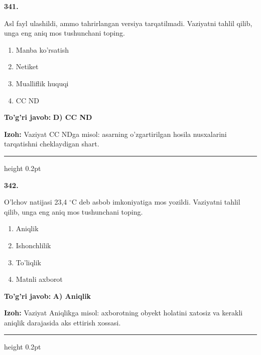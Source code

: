 \documentclass[10pt,a4paper,oneside]{article}
\begin{document}
\noindent\textbf{\color{ink}341.}
\par
Asl fayl ulashildi, ammo tahrirlangan versiya tarqatilmadi. Vaziyatni tahlil qilib, unga eng aniq mos tushunchani toping.
\begin{enumerate}[label=\Alph*),leftmargin=9mm]
\item Manba ko'rsatish
\item Netiket
\item Mualliflik huquqi
\item CC ND
\end{enumerate}
\begin{tcolorbox}[enhanced,breakable,colback=teal!4,colframe=teal!50!black,boxrule=0.5pt,arc=1.1mm,left=3mm,right=3mm,top=1.7mm,bottom=1.7mm,before skip=2mm,after skip=2mm]
\textbf{\color{teal}To'g'ri javob:} \textbf{D) CC ND}
\par\smallskip
\textbf{Izoh:} Vaziyat CC NDga misol: asarning o'zgartirilgan hosila nusxalarini tarqatishni cheklaydigan shart.
\end{tcolorbox}
\vspace{2mm}\hrule height 0.2pt \vspace{3mm}

\noindent\textbf{\color{ink}342.}
\par
O'lchov natijasi 23,4 \ensuremath{^\circ}C deb asbob imkoniyatiga mos yozildi. Vaziyatni tahlil qilib, unga eng aniq mos tushunchani toping.
\begin{enumerate}[label=\Alph*),leftmargin=9mm]
\item Aniqlik
\item Ishonchlilik
\item To'liqlik
\item Matnli axborot
\end{enumerate}
\begin{tcolorbox}[enhanced,breakable,colback=teal!4,colframe=teal!50!black,boxrule=0.5pt,arc=1.1mm,left=3mm,right=3mm,top=1.7mm,bottom=1.7mm,before skip=2mm,after skip=2mm]
\textbf{\color{teal}To'g'ri javob:} \textbf{A) Aniqlik}
\par\smallskip
\textbf{Izoh:} Vaziyat Aniqlikga misol: axborotning obyekt holatini xatosiz va kerakli aniqlik darajasida aks ettirish xossasi.
\end{tcolorbox}
\vspace{2mm}\hrule height 0.2pt \vspace{3mm}
\end{document}

